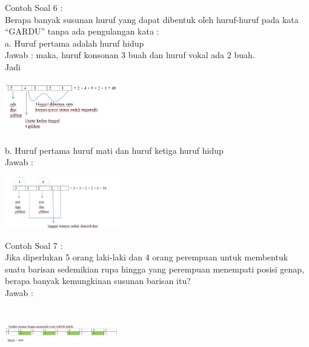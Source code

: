 \documentclass[11pt,fleqn]{book} %
\begin{document}
Contoh Soal 6 :\\

Berapa banyak susunan huruf yang dapat dibentuk oleh huruf-huruf pada kata “GARDU” tanpa ada pengulangan kata :\\

a.  Huruf pertama adalah huruf hidup\\

Jawab : maka, huruf konsonan 3 buah dan huruf vokal ada 2 buah. \\

Jadi\\

\includegraphics[width = 5cm, height=3cm]{Pictures/soalkaidah1.png}\\


b.      Huruf pertama huruf mati dan huruf ketiga huruf hidup\\

Jawab :\\

\includegraphics[width = 5cm, height=3cm]{Pictures/soalkaidah2.png}\\

Contoh Soal 7 :\\

Jika diperlukan 5 orang laki-laki dan 4 orang perempuan untuk membentuk suatu barisan sedemikian rupa hingga yang perempuan menempati posisi genap, berapa banyak kemungkinan susunan barisan itu?\\

Jawab :\\

\includegraphics[width = 5cm, height=3cm]{Pictures/soalkaidah3.png}\\
\end{document}
